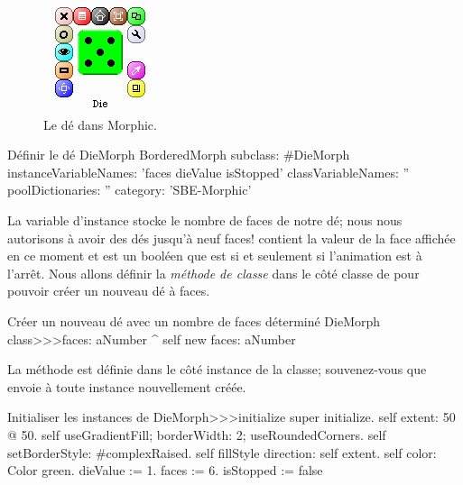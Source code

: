 \documentclass[a4paper,10pt,twoside]{book}
\begin{document}
\begin{figure}[ht]
	\centerline{\includegraphics[scale=0.65]{die}}
	\caption{Le d\'e dans Morphic.\label{fig:dialogDie}}
\end{figure}


\begin{classdef}{D\'efinir le d\'e DieMorph}
BorderedMorph subclass: #DieMorph
	instanceVariableNames: 'faces dieValue isStopped'
	classVariableNames: ''
	poolDictionaries: ''
	category: 'SBE-Morphic'
\end{classdef}

La variable d'instance  stocke le nombre de faces de notre
d\'e; nous nous autorisons \`a avoir des d\'es jusqu'\`a neuf faces!
 contient la valeur de la face affich\'ee en ce moment et
 est un bool\'een que est  si et seulement si
l'animation est \`a l'arr\^et.
Nous allons d\'efinir la \emph{m\'ethode de classe}  dans
le c\^ot\'e classe de  pour pouvoir cr\'eer un
nouveau d\'e \`a  faces.

\begin{method}{Cr\'eer un nouveau d\'e avec un nombre de faces d\'etermin\'e}
DieMorph class>>>faces: aNumber
	^ self new faces: aNumber
\end{method}

La m\'ethode  est d\'efinie dans le c\^ot\'e instance
de la classe; souvenez-vous que  envoie  \`a
toute instance nouvellement cr\'e\'ee.

\begin{method}{Initialiser les instances de }
DieMorph>>>initialize
	super initialize.
	self extent: 50 @ 50.
	self useGradientFill; borderWidth: 2; useRoundedCorners.
	self setBorderStyle: #complexRaised.
	self fillStyle direction: self extent.
	self color: Color green.
	dieValue := 1.
	faces := 6.
	isStopped := false
\end{method}
\end{document}
